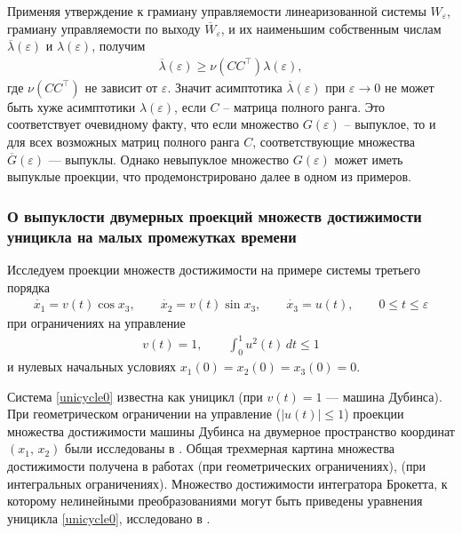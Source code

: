 \documentclass[../main.tex]{subfiles}
\begin{document}
    Применяя утверждение к грамиану управляемости линеаризованной системы $ W_{\varepsilon} $, грамиану управляемости по выходу $ \overline{W}_{\varepsilon}$, и их наименьшим собственным числам $ \overline{\lambda}(\varepsilon) $ и $ \lambda(\varepsilon) $, получим
    \begin{gather*}
        \overline{\lambda}(\varepsilon) \geqslant \nu(CC^{\top}) \lambda(\varepsilon),
    \end{gather*}
    где $ \nu(CC^{\top}) $ не зависит от $ \varepsilon $. 
    Значит асимптотика $ \overline{\lambda}(\varepsilon) $ при $\varepsilon \rightarrow 0$ не может быть хуже асимптотики $ \lambda(\varepsilon) $, если $ C $ -- матрица полного ранга. 
    Это соответствует очевидному факту, что если множество $ G(\varepsilon) $ -- выпуклое, то и для всех возможных матриц полного ранга $ C $, соответствующие множества $ \overline{G}(\varepsilon) $ --- выпуклы. 
    Однако невыпуклое множество $ G(\varepsilon) $  может иметь выпуклые проекции, что продемонстрировано далее в одном из примеров.
    
\subsubsection{О выпуклости двумерных проекций множеств достижимости уницикла на малых промежутках времени}    
    Исследуем проекции множеств достижимости на примере системы третьего порядка
    \begin{gather}\label{unicycle0}
        \dot{x_1} = v(t)\cos x_3, \qquad
        \dot{x_2} = v(t)\sin x_3, \qquad
        \dot{x_3} = u(t), \qquad 0 \leqslant t \leqslant \varepsilon
    \end{gather}
    при ограничениях на управление 
    \begin{gather*}
        v(t) = 1, \qquad \int_0^1 u^2(t) \, dt \leqslant 1
    \end{gather*}
    и нулевых начальных условиях $ x_1(0) = x_2(0) = x_3(0) = 0 $.
    
    Система \eqref{unicycle0} известна как уницикл (при $ v(t) = 1$  --- машина Дубинса). 
При геометрическом
    ограничении на
    управление ($|u(t)|\leqslant 1$) проекции множества достижимости  машины Дубинса  на двумерное пространство координат $(x_1,\,x_2)$ были исследованы в
    \cite{Cockayne}. 
Общая трехмерная картина множества достижимости получена в
    работах \cite{Patsko} (при геометрических ограничениях), \cite{Patsko2023} (при интегральных ограничениях). 
Множество достижимости интегратора Брокетта, к которому нелинейными преобразованиями могут быть приведены уравнения уницикла \eqref{unicycle0}, исследовано в \cite{Vdovin}.
    
\end{document}
